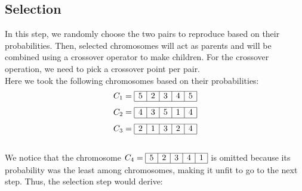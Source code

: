 \documentclass{article}
\begin{document}
    \subsection{Selection}
    In this step, we randomly choose the two pairs to reproduce based on their probabilities. Then, selected chromosomes will act as parents and will be combined using a crossover operator to make children. For the crossover operation, we need to pick a crossover point per pair. \\
    Here we took the following chromosomes based on their probabilities:
    $$ C_1 = 
        \begin{array}{|c|c|c|c|c|}
            \hline
            5&2&3&4&5 \\\hline
        \end{array}
    $$
    $$ C_2 = 
        \begin{array}{|c|c|c|c|c|}
            \hline
            4&3&5&1&4 \\\hline
        \end{array}
    $$
    $$ C_3 = 
        \begin{array}{|c|c|c|c|c|}
            \hline
            2&1&3&2&4 \\\hline
        \end{array}
    $$ \\
    We notice that the chromosome  
    $ C_4 = 
        \begin{array}{|c|c|c|c|c|}
            \hline
            5&2&3&4&1 \\\hline
        \end{array}
    $ \quad is omitted because its probability was the least among chromosomes, making it unfit to go to the next step. Thus, the selection step would derive: \\
\end{document}
